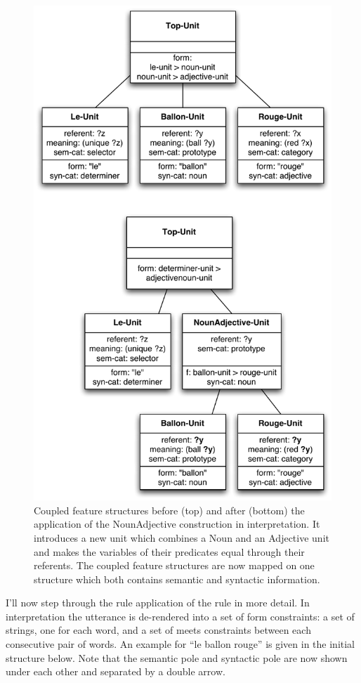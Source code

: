 \begin{figure}[htbp]
  \begin{center}
    \includegraphics[width=.75\textwidth]{./frameworks/figures/nounadj-application.pdf}
    \caption[Coupled feature structures before and after the
    application of an example construction]{Coupled feature structures
      before (top) and after (bottom) the application of the
      NounAdjective construction in interpretation. It introduces a
      new unit which combines a Noun and an Adjective unit and makes
      the variables of their predicates equal through their
      referents. The coupled feature structures are now mapped on one
      structure which both contains semantic and syntactic
      information.}
    \label{f:nounadj-application}
  \end{center}
\end{figure}

I'll now step through the rule application of the rule in more
detail. In interpretation the utterance is de-rendered into a set of
form constraints: a set of strings, one for each word, and a set of
meets constraints between each consecutive pair of words. An example
for ``le ballon rouge'' is given in the initial structure below. Note
that the semantic pole and syntactic pole are now shown under each
other and separated by a double arrow.

